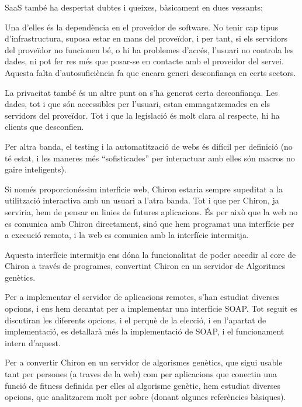 \documentclass[titlepage,a4paper,12pt]{book}
\begin{document}
	   SaaS també ha despertat dubtes i queixes, bàsicament en dues vessants:

	   Una d'elles és la dependència en el proveïdor de software.  No tenir cap tipus
	   d'infrastructura, suposa estar en mans del proveïdor, i per tant, si els
	   servidors del proveïdor no funcionen bé, o hi ha problemes d'accés, l'usuari
	   no controla les dades, ni pot fer res més que posar-se en contacte amb el
	   proveidor del servei.  Aquesta falta d'autosuficiència fa que encara generi
	   desconfiança en certs sectors.

	   La privacitat també és un altre punt on s'ha generat certa desconfiança.  Les
	   dades, tot i que són accessibles per l'usuari, estan emmagatzemades en els
	   servidors del proveïdor.  Tot i que la legislació és molt clara al respecte,
	   hi ha clients que desconfien.

	   Per altra banda, el testing i la automatització de webs és difícil per
	   definició (no té estat, i les maneres més ``sofisticades'' per interactuar amb
			   elles són macros no gaire inteligents).

	   Si només proporcionéssim interficie web, Chiron estaria sempre supeditat a la
	   utilització interactiva amb un usuari a l'atra banda.  Tot i que per Chiron, ja
	   serviria, hem de pensar en linies de futures aplicacions.  És per això que la
	   web no es comunica amb Chiron directament, sinó que hem programat una interfície
	   per a execució remota, i la web es comunica amb la interfície intermitja.

	   Aquesta interfície intermitja ens dóna la funcionalitat de poder accedir al core 
	   de Chiron a través de programes, convertint Chiron en un servidor de Algoritmes
	   genètics.

	   Per a implementar el servidor de aplicacions remotes, s'han estudiat diverses
	   opcions, i ens hem decantat per a implementar una interfície SOAP.  Tot seguit
	   es discutiran les diferents opcions, i el perquè de la elecció, i en l'apartat
	   de implementació, es detallarà més la implementació de SOAP, i el funcionament
	   intern d'aquest.


	   Per a convertir Chiron en un servidor de algorismes genètics, que sigui usable
	   tant per persones (a traves de la web) com per aplicacions que conectin una
	   funció de fitness definida per elles al algorisme genètic, hem estudiat diverses
	   opcions, que analitzarem molt per sobre (donant algunes referències bàsiques).
\end{document}
